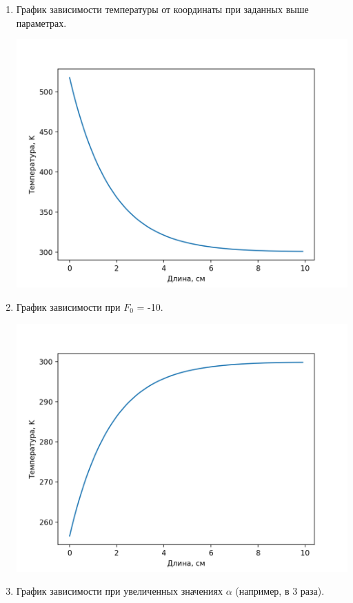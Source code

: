 \documentclass[a4paper,14pt]{extreport} %
\begin{document}
\begin{enumerate}
\item График зависимости температуры от координаты при заданных выше параметрах.

\includegraphics[scale=0.9]{graph1}
\item График зависимости при $F_0$ = -10. 

\includegraphics[scale=0.9]{graph2}
\item График зависимости при увеличенных значениях $\alpha$ (например, в 3 раза). 


\end{enumerate}
\end{document}
